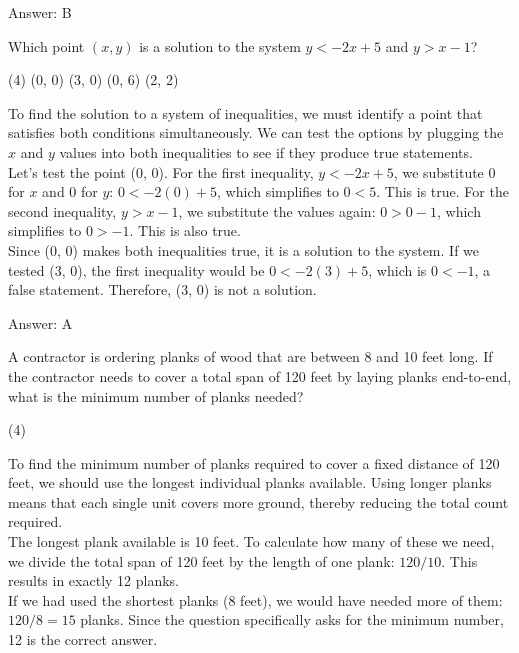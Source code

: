 \documentclass[11pt,paper=a4,answers]{exam}
\begin{document}
\begin{questions}
\begin{solution}
\vspace{15pt}
Answer: \colorbox{yellow!100}{B}
\end{solution}

\question
Which point $(x, y)$ is a solution to the system $y < -2x + 5$ and $y > x - 1$?
\begin{tasks}(4)
    \task (0, 0)
    \task (3, 0)
    \task (0, 6)
    \task (2, 2)
\end{tasks}

\begin{solution}
To find the solution to a system of inequalities, we must identify a point that satisfies both conditions simultaneously. We can test the options by plugging the $x$ and $y$ values into both inequalities to see if they produce true statements.
\\[10pt]
Let's test the point (0, 0). For the first inequality, $y < -2x + 5$, we substitute 0 for $x$ and 0 for $y$: $0 < -2(0) + 5$, which simplifies to $0 < 5$. This is true. For the second inequality, $y > x - 1$, we substitute the values again: $0 > 0 - 1$, which simplifies to $0 > -1$. This is also true.
\\[10pt]
Since (0, 0) makes both inequalities true, it is a solution to the system. If we tested (3, 0), the first inequality would be $0 < -2(3) + 5$, which is $0 < -1$, a false statement. Therefore, (3, 0) is not a solution.

\vspace{15pt}
Answer: \colorbox{yellow!100}{A}
\end{solution}

\question
A contractor is ordering planks of wood that are between 8 and 10 feet long. If the contractor needs to cover a total span of 120 feet by laying planks end-to-end, what is the minimum number of planks needed?
\begin{tasks}(4)
\end{tasks}

\begin{solution}
To find the minimum number of planks required to cover a fixed distance of 120 feet, we should use the longest individual planks available. Using longer planks means that each single unit covers more ground, thereby reducing the total count required.
\\[10pt]
The longest plank available is 10 feet. To calculate how many of these we need, we divide the total span of 120 feet by the length of one plank: $120 / 10$. This results in exactly 12 planks.
\\[10pt]
If we had used the shortest planks (8 feet), we would have needed more of them: $120 / 8 = 15$ planks. Since the question specifically asks for the minimum number, 12 is the correct answer.


\end{solution}
\end{questions}
\end{document}

